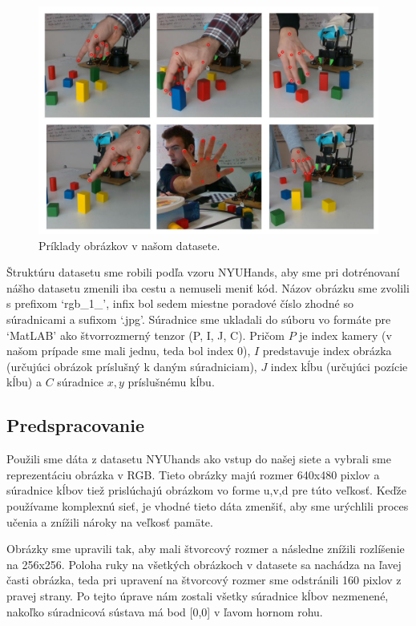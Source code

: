 \begin{figure}[H]
	\begin{center}
		\includegraphics[width=\textwidth]{images/our_hands.jpg}
		\caption{Príklady obrázkov v našom  datasete.}
		\label{img:our_hands}
	\end{center}
\end{figure}

Štruktúru datasetu sme robili podľa vzoru NYUHands, aby sme pri dotrénovaní nášho datasetu zmenili iba cestu a nemuseli meniť kód. Názov obrázku sme zvolili s prefixom `rgb\_1\_', infix bol sedem miestne poradové číslo zhodné so súradnicami a sufixom `.jpg'. Súradnice sme ukladali do súboru vo formáte pre `MatLAB' ako štvorrozmerný tenzor (P, I, J, C). Pričom $P$ je index kamery (v našom prípade sme mali jednu, teda bol index 0), $I$ predstavuje index obrázka (určujúci obrázok príslušný k daným súradniciam), $J$ index kĺbu (určujúci pozície kĺbu) a $C$ súradnice $x, y$ príslušnému kĺbu.

\subsection{Predspracovanie}
Použili sme dáta z datasetu NYUhands ako vstup do našej siete a vybrali sme reprezentáciu obrázka v RGB. Tieto obrázky majú rozmer 640x480 pixlov a súradnice kĺbov tiež prislúchajú obrázkom vo forme u,v,d pre túto veľkosť. Keďže používame komplexnú sieť, je vhodné tieto dáta zmenšiť, aby sme urýchlili proces učenia a znížili nároky na veľkosť pamäte. 

Obrázky sme upravili tak, aby mali štvorcový rozmer a následne znížili rozlíšenie na 256x256. Poloha ruky na všetkých obrázkoch v datasete sa nachádza na ľavej časti obrázka, teda pri upravení na štvorcový rozmer sme odstránili 160 pixlov z pravej strany. Po tejto úprave nám zostali všetky súradnice kĺbov nezmenené, nakoľko súradnicová sústava má bod [0,0] v ľavom hornom rohu.

